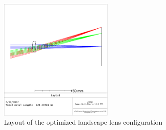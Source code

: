 \documentclass[10pt,a4paper]{article}
\begin{document}
		\begin{figure}[H]
			\centering
			\includegraphics[width=0.5\textwidth]{../zemax/2_optimized/layout}
			\caption{Layout of the optimized landscape lens configuration}
			\label{layout_opto}
		\end{figure}		
\end{document}
